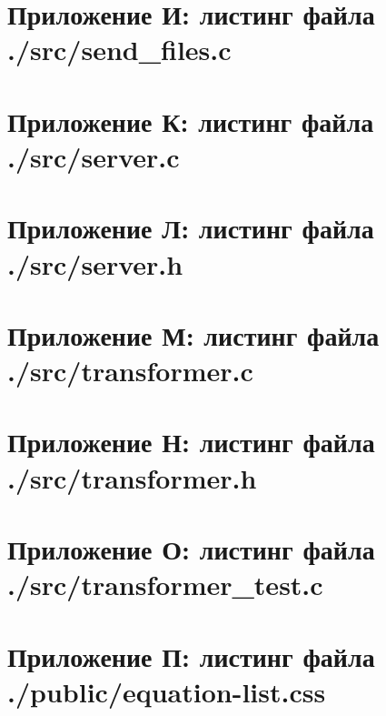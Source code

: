 \documentclass{article}
\begin{document}
    \section{Приложение И: листинг файла ./src/send\_files.c}
    

    \section{Приложение К: листинг файла ./src/server.c}
    

    \section{Приложение Л: листинг файла ./src/server.h}
    

    \section{Приложение М: листинг файла ./src/transformer.c}
    

    \section{Приложение Н: листинг файла ./src/transformer.h}
    

    \section{Приложение О: листинг файла ./src/transformer\_test.c}
    


    \section{Приложение П: листинг файла ./public/equation-list.css}
    
\end{document}
